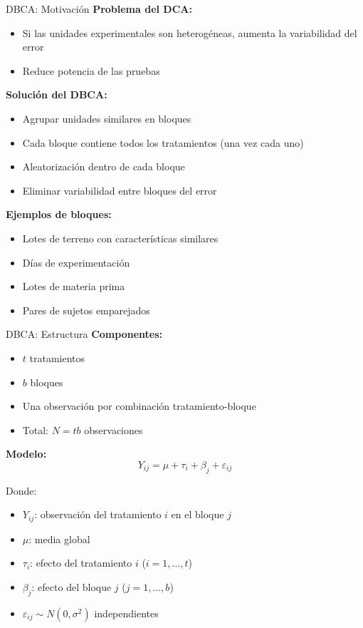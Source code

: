 \documentclass[aspectratio=169]{beamer}
\begin{document}
\begin{frame}{DBCA: Motivación}
\textbf{Problema del DCA:}
\begin{itemize}
\item Si las unidades experimentales son heterogéneas, aumenta la variabilidad del error
\item Reduce potencia de las pruebas
\end{itemize}

\vspace{0.3cm}
\textbf{Solución del DBCA:}
\begin{itemize}
\item Agrupar unidades similares en bloques
\item Cada bloque contiene todos los tratamientos (una vez cada uno)
\item Aleatorización dentro de cada bloque
\item Eliminar variabilidad entre bloques del error
\end{itemize}

\vspace{0.3cm}
\textbf{Ejemplos de bloques:}
\begin{itemize}
\item Lotes de terreno con características similares
\item Días de experimentación
\item Lotes de materia prima
\item Pares de sujetos emparejados
\end{itemize}
\end{frame}

\begin{frame}{DBCA: Estructura}
\textbf{Componentes:}
\begin{itemize}
\item $t$ tratamientos
\item $b$ bloques
\item Una observación por combinación tratamiento-bloque
\item Total: $N = tb$ observaciones
\end{itemize}

\vspace{0.3cm}
\textbf{Modelo:}
$$Y_{ij} = \mu + \tau_i + \beta_j + \varepsilon_{ij}$$

Donde:
\begin{itemize}
\item $Y_{ij}$: observación del tratamiento $i$ en el bloque $j$
\item $\mu$: media global
\item $\tau_i$: efecto del tratamiento $i$ ($i=1,\ldots,t$)
\item $\beta_j$: efecto del bloque $j$ ($j=1,\ldots,b$)
\item $\varepsilon_{ij} \sim N(0,\sigma^2)$ independientes
\end{itemize}
\end{frame}
\end{document}

